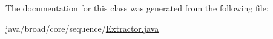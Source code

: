 The documentation for this class was generated from the following file\+:\begin{DoxyCompactItemize}
\item 
java/broad/core/sequence/\hyperlink{_extractor_8java}{Extractor.\+java}\end{DoxyCompactItemize}
